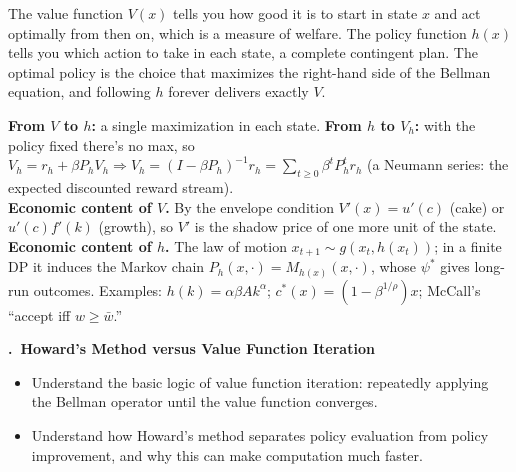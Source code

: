 \documentclass[11pt]{article}
\newcounter{qn}
\newcommand{\question}[1]{\par\needspace{14\baselineskip}\refstepcounter{qn}\medskip
{\bfseries\color{ink}\large \theqn.\ #1}\par\smallskip}
\begin{document}
\begin{resp}
The value function $V(x)$ tells you how good it is to start in state $x$ and act optimally from then on, which is a measure of welfare. The policy function $h(x)$ tells you which action to take in each state, a complete contingent plan. The optimal policy is the choice that maximizes the right-hand side of the Bellman equation, and following $h$ forever delivers exactly $V$.
\end{resp}
\begin{intu}
\textbf{From $V$ to $h$:} a single maximization in each state. \textbf{From $h$ to $V_h$:} with the policy fixed there's no max, so $V_h=r_h+\beta P_hV_h\Rightarrow V_h=(I-\beta P_h)^{-1}r_h=\sum_{t\ge0}\beta^tP_h^tr_h$ (a Neumann series: the expected discounted reward stream).\\
\textbf{Economic content of $V$.} By the envelope condition $V'(x)=u'(c)$ (cake) or $u'(c)f'(k)$ (growth), so $V'$ is the shadow price of one more unit of the state.\\
\textbf{Economic content of $h$.} The law of motion $x_{t+1}\sim g(x_t,h(x_t))$; in a finite DP it induces the Markov chain $P_h(x,\cdot)=M_{h(x)}(x,\cdot)$, whose $\psi^*$ gives long-run outcomes. Examples: $h(k)=\alpha\beta Ak^\alpha$; $c^*(x)=(1-\beta^{1/\rho})x$; McCall's ``accept iff $w\ge\bar w$.''
\end{intu}

\question{Howard's Method versus Value Function Iteration}
\begin{itemize}[leftmargin=1.2em,itemsep=0pt]\itshape
\item Understand the basic logic of value function iteration: repeatedly applying the Bellman operator until the value function converges.
\item Understand how Howard's method separates policy evaluation from policy improvement, and why this can make computation much faster.
\end{itemize}
\end{document}
